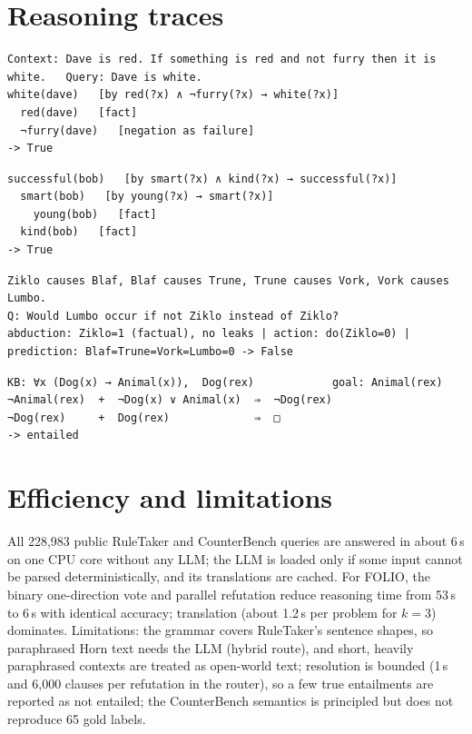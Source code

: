 \documentclass[10pt,a4paper]{article}
\begin{document}
\section{Reasoning traces}
\begin{Verbatim}[fontsize=\footnotesize,frame=single,label={RuleTaker, backward chaining with negation as failure}]
Context: Dave is red. If something is red and not furry then it is white.   Query: Dave is white.
white(dave)   [by red(?x) ∧ ¬furry(?x) → white(?x)]
  red(dave)   [fact]
  ¬furry(dave)   [negation as failure]                                         -> True
\end{Verbatim}
\begin{Verbatim}[fontsize=\footnotesize,frame=single,label={Assignment example, proof tree}]
successful(bob)   [by smart(?x) ∧ kind(?x) → successful(?x)]
  smart(bob)   [by young(?x) → smart(?x)]
    young(bob)   [fact]
  kind(bob)   [fact]                                                             -> True
\end{Verbatim}
\begin{Verbatim}[fontsize=\footnotesize,frame=single,label={CounterBench, counterfactual}]
Ziklo causes Blaf, Blaf causes Trune, Trune causes Vork, Vork causes Lumbo.
Q: Would Lumbo occur if not Ziklo instead of Ziklo?
abduction: Ziklo=1 (factual), no leaks | action: do(Ziklo=0) | prediction: Blaf=Trune=Vork=Lumbo=0 -> False
\end{Verbatim}
\begin{Verbatim}[fontsize=\footnotesize,frame=single,label={Resolution refutation}]
KB: ∀x (Dog(x) → Animal(x)),  Dog(rex)            goal: Animal(rex)
¬Animal(rex)  +  ¬Dog(x) ∨ Animal(x)  ⇒  ¬Dog(rex)
¬Dog(rex)     +  Dog(rex)             ⇒  □                                     -> entailed
\end{Verbatim}

\section{Efficiency and limitations}
All 228{,}983 public RuleTaker and CounterBench queries are answered in about 6\,s on one CPU core without any LLM; the LLM is loaded only if some input cannot be parsed deterministically, and its translations are cached. For FOLIO, the binary one-direction vote and parallel refutation reduce reasoning time from 53\,s to 6\,s with identical accuracy; translation (about 1.2\,s per problem for $k{=}3$) dominates. Limitations: the grammar covers RuleTaker's sentence shapes, so paraphrased Horn text needs the LLM (hybrid route), and short, heavily paraphrased contexts are treated as open-world text; resolution is bounded (1\,s and 6{,}000 clauses per refutation in the router), so a few true entailments are reported as not entailed; the CounterBench semantics is principled but does not reproduce 65 gold labels.
\end{document}

